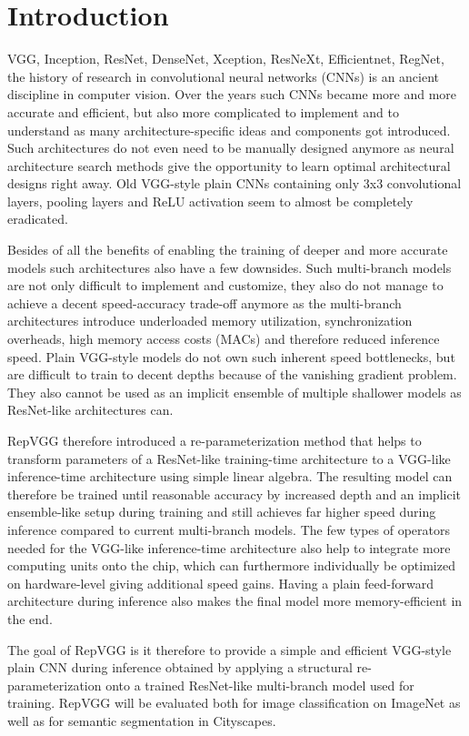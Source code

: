 \section{Introduction}

VGG, Inception, ResNet, DenseNet, Xception, ResNeXt, Efficientnet, RegNet, the history of research in convolutional neural networks (CNNs) is an ancient discipline in computer vision. Over the years such CNNs became more and more accurate and efficient, but also more complicated to implement and to understand as many architecture-specific ideas and components got introduced. Such architectures do not even need to be manually designed anymore as neural architecture search methods give the opportunity to learn optimal architectural designs right away. Old VGG-style plain CNNs containing only 3x3 convolutional layers, pooling layers and ReLU activation seem to almost be completely eradicated. 

Besides of all the benefits of enabling the training of deeper and more accurate models such architectures also have a few downsides. Such multi-branch models are not only difficult to implement and customize, they also do not manage to achieve a decent speed-accuracy trade-off anymore as the multi-branch architectures introduce underloaded memory utilization, synchronization overheads, high memory access costs (MACs) and therefore reduced inference speed. Plain VGG-style models do not own such inherent speed bottlenecks, but are difficult to train to decent depths because of the vanishing gradient problem. They also cannot be used as an implicit ensemble of multiple shallower models as ResNet-like architectures can. 

RepVGG therefore introduced a re-parameterization method that helps to transform parameters of a ResNet-like training-time architecture to a VGG-like inference-time architecture using simple linear algebra. The resulting model can therefore be trained until reasonable accuracy by increased depth and an implicit ensemble-like setup during training and still achieves far higher speed during inference compared to current multi-branch models. The few types of operators needed for the VGG-like inference-time architecture also help to integrate more computing units onto the chip, which can furthermore individually be optimized on hardware-level giving additional speed gains. Having a plain feed-forward architecture during inference also makes the final model more memory-efficient in the end. 

The goal of RepVGG is it therefore to provide a simple and efficient VGG-style plain CNN during inference obtained by applying a structural re-parameterization onto a trained ResNet-like multi-branch model used for training. RepVGG will be evaluated both for image classification on ImageNet as well as for semantic segmentation in Cityscapes. 
 